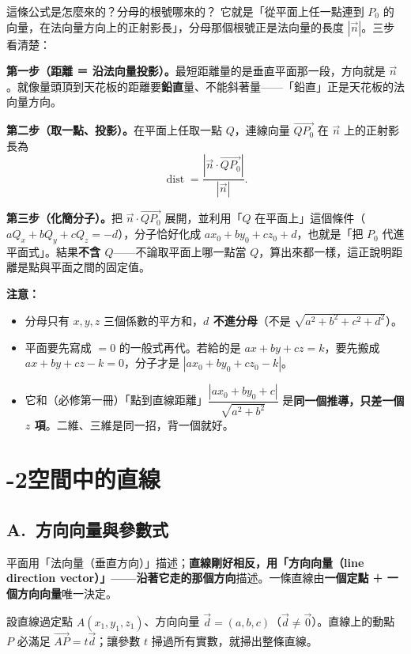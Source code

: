 \documentclass[11pt]{article}
\begin{document}
\begin{補充框}{這條公式是怎麼來的？分母的根號哪來的？}
它就是「從平面上任一點連到 $P_0$ 的向量，在法向量方向上的正射影長」，分母那個根號正是法向量的長度 $|\vec n|$。三步看清楚：

\textbf{第一步（距離 ＝ 沿法向量投影）。}最短距離量的是垂直平面那一段，方向就是 $\vec n$。就像量頭頂到天花板的距離要\textbf{鉛直}量、不能斜著量——「鉛直」正是天花板的法向量方向。

\textbf{第二步（取一點、投影）。}在平面上任取一點 $Q$，連線向量 $\vec{QP_0}$ 在 $\vec n$ 上的正射影長為
$$\operatorname{dist}=\frac{|\vec n\cdot\vec{QP_0}|}{|\vec n|}.$$

\textbf{第三步（化簡分子）。}把 $\vec n\cdot\vec{QP_0}$ 展開，並利用「$Q$ 在平面上」這個條件（$aQ_x+bQ_y+cQ_z=-d$），分子恰好化成 $ax_0+by_0+cz_0+d$，也就是「把 $P_0$ 代進平面式」。結果\textbf{不含 $Q$}——不論取平面上哪一點當 $Q$，算出來都一樣，這正說明距離是點與平面之間的固定值。

\textbf{注意：}
\begin{itemize}\setlength{\itemsep}{1pt}
\item 分母只有 $x,y,z$ 三個係數的平方和，\textbf{$d$ 不進分母}（不是 $\sqrt{a^2+b^2+c^2+d^2}$）。
\item 平面要先寫成 $=0$ 的一般式再代。若給的是 $ax+by+cz=k$，要先搬成 $ax+by+cz-k=0$，分子才是 $|ax_0+by_0+cz_0-k|$。
\item 它和（必修第一冊）「點到直線距離」$\dfrac{|ax_0+by_0+c|}{\sqrt{a^2+b^2}}$ 是\textbf{同一個推導，只差一個 $z$ 項}。二維、三維是同一招，背一個就好。
\end{itemize}
\end{補充框}

\section*{-2\quad 空間中的直線}

\subsection*{\sffamily A.\ 方向向量與參數式}

平面用「法向量（垂直方向）」描述；\textbf{直線剛好相反，用「方向向量（line direction vector）」——沿著它走的那個方向}描述。一條直線由\textbf{一個定點} ＋ \textbf{一個方向向量}唯一決定。

設直線過定點 $A(x_1,y_1,z_1)$、方向向量 $\vec d=(a,b,c)$（$\vec d\ne\vec0$）。直線上的動點 $P$ 必滿足 $\vec{AP}=t\vec d$；讓參數 $t$ 掃過所有實數，就掃出整條直線。
\end{document}
